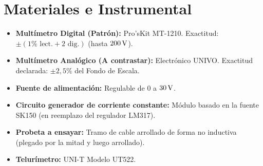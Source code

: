 \chapter{Materiales e Instrumental}
\begin{itemize}
    \item \textbf{Multímetro Digital (Patrón):} Pro'sKit MT-1210. Exactitud: $\pm (1\% \text{ lect.} + 2 \text{ dig.})$ (hasta $200 \,\mathrm{V}$).
    \item \textbf{Multímetro Analógico (A contrastar):} Electrónico UNIVO. Exactitud declarada: $\pm 2,5 \percent$ del Fondo de Escala.
    \item \textbf{Fuente de alimentación:} Regulable de $0$ a $30 \,\mathrm{V}$.
    \item \textbf{Circuito generador de corriente constante:} Módulo basado en la fuente SK150 (en reemplazo del regulador LM317).
    \item \textbf{Probeta a ensayar:} Tramo de cable arrollado de forma no inductiva (plegado por la mitad y luego arrollado).
    \item \textbf{Telurímetro:} UNI-T Modelo UT522.
\end{itemize}

